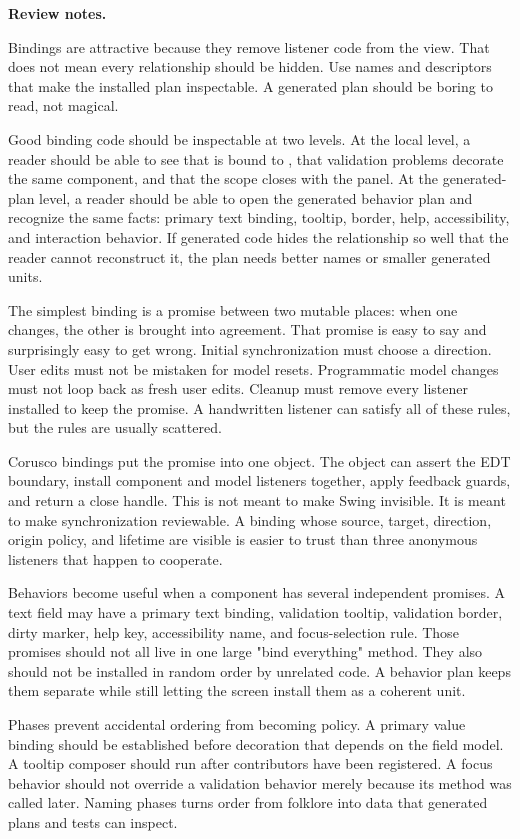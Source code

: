 \textbf{Review notes.}

Bindings are attractive because they remove listener code from the view. That
does not mean every relationship should be hidden. Use names and descriptors
that make the installed plan inspectable. A generated plan should be boring to
read, not magical.

Good binding code should be inspectable at two levels. At the local level, a
reader should be able to see that  is bound to ,
that validation problems decorate the same component, and that the scope closes
with the panel. At the generated-plan level, a reader should be able to open the
generated behavior plan and recognize the same facts: primary text binding,
tooltip, border, help, accessibility, and interaction behavior. If generated
code hides the relationship so well that the reader cannot reconstruct it, the
plan needs better names or smaller generated units.

The simplest binding is a promise between two mutable places: when one changes,
the other is brought into agreement. That promise is easy to say and surprisingly
easy to get wrong. Initial synchronization must choose a direction. User edits
must not be mistaken for model resets. Programmatic model changes must not loop
back as fresh user edits. Cleanup must remove every listener installed to keep
the promise. A handwritten listener can satisfy all of these rules, but the
rules are usually scattered.

Corusco bindings put the promise into one object. The object can assert the EDT
boundary, install component and model listeners together, apply feedback guards,
and return a close handle. This is not meant to make Swing invisible. It is meant
to make synchronization reviewable. A binding whose source, target, direction,
origin policy, and lifetime are visible is easier to trust than three anonymous
listeners that happen to cooperate.

Behaviors become useful when a component has several independent promises. A
text field may have a primary text binding, validation tooltip, validation
border, dirty marker, help key, accessibility name, and focus-selection rule.
Those promises should not all live in one large "bind everything" method. They
also should not be installed in random order by unrelated code. A behavior plan
keeps them separate while still letting the screen install them as a coherent
unit.

Phases prevent accidental ordering from becoming policy. A primary value binding
should be established before decoration that depends on the field model. A
tooltip composer should run after contributors have been registered. A focus
behavior should not override a validation behavior merely because its method was
called later. Naming phases turns order from folklore into data that generated
plans and tests can inspect.

